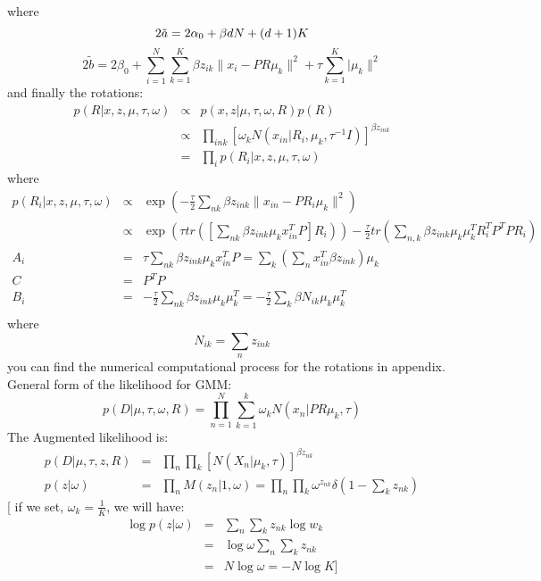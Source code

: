 \documentclass[11pt]{article}
\begin{document}
where
\begin{equation*}
2\tilde{a}=2\alpha_0+\beta dN+(d+1)K \\
\end{equation*}
\begin{equation*}
2\tilde{b}=2\beta_0+\sum_{i=1}^N\sum_{k=1}^K \beta z_{ik}\|x_i-PR\mu_k\|^2+\tau\sum_{k=1}^K|\mu_k\|^2
\end{equation*}
and finally the rotations:
\begin{eqnarray*}
p(R|x,z,\mu,\tau,\omega) &\propto & p(x,z|\mu,\tau,\omega,R)p(R)\\
&\propto & \prod_{ink}[\omega_kN(x_{in}|R_i,\mu_k,\tau^{-1}I)]^{\beta z_{ink}}\\
&=& \prod_{i}p(R_i|x,z,\mu,\tau,\omega)
\end{eqnarray*}
where
\begin{eqnarray*}
p(R_i|x,z,\mu,\tau,\omega) &\propto & \exp(-\frac{\tau}{2}\sum_{nk} \beta z_{ink}\|x_{in}-PR_i\mu_k\|^2)\\
& \propto & \exp(\tau tr([\sum_{nk}\beta z_{ink}\mu_kx_{in}^TP]R_i))-\frac{\tau}{2}tr(\sum_{n,k} \beta z_{ink}\mu_k\mu_k^TR_i^TP^TPR_i)\\
A_i&=& \tau\sum_{nk}\beta z_{ink}\mu_kx_{in}^TP=\sum_k(\sum_nx_{in}^T \beta z_{ink})\mu_k\\
C &=& P^TP\\
B_i &=& -\frac{\tau}{2}\sum_{nk}\beta z_{ink}\mu_k\mu_k^T=-\frac{\tau}{2}\sum_{k}\beta N_{ik}\mu_k\mu_k^T\\
\end{eqnarray*}
where
\begin{equation*}
 N_{ik}=\sum_nz_{ink}
\end{equation*}
you can find the numerical computational process for the rotations in appendix. \\
General form of the likelihood for GMM:
\begin{equation*}
p(D|\mu,\tau,\omega,R) = \prod_{n=1}^N\sum_{k=1}^k\omega_kN(x_n|PR\mu_k,\tau)
\end{equation*}
The Augmented likelihood is:
\begin{eqnarray*}
p(D|\mu,\tau,z,R) &=& \prod_n\prod_k[N(X_n|\mu_k,\tau)]^{\beta z_{nk}}\\
p(z|\omega) &=& \prod_nM(z_n|1,\omega)=\prod_n\prod_k\omega^{z_{nk}}\delta(1-\sum_kz_{nk})
\end{eqnarray*}
 [ if we set, $\omega_k=\frac{1}{K} $, \quad we will have:
\begin{eqnarray*}
\log{p(z|\omega)}&=&\sum_n\sum_kz_{nk}\log{w_k} \\
&=&\log{\omega}\sum_n\sum_kz_{nk} \\
&=&N\log{\omega}=-N\log{K}]
\end{eqnarray*}  
\end{document}
